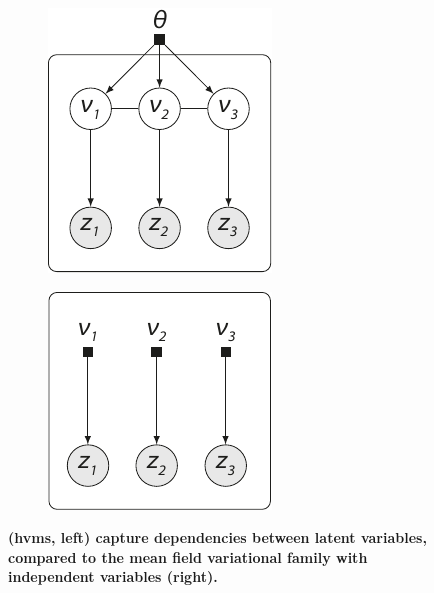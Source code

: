 \newcommand{\mywidtht}{0.25\textheight}
\newcommand{\figwidtht}{0.3\textheight}
\begin{figure}[t]
  \centering
  \hfill%
  \begin{subfigure}[b]{\figwidtht}
    \centering
    \includegraphics[width=\mywidtht]{ch-hvm/fig/hierarchical-variational-model.pdf}
    \label{fig:hvm-graphical-model}%
  \end{subfigure}
  \hspace*{\fill}%
  \begin{subfigure}[b]{\figwidtht}
    \centering
    \includegraphics[width=\mywidtht]{ch-hvm/fig/mean-field-graphical-model.pdf}
    \label{fig:mean field-graphical-model}%
  \end{subfigure}
  \hspace*{\fill}%
  \caption[\textsc{hvm} and mean field approximation graphical models]{\textbf{ (\glspl{hvm}, left) capture dependencies between latent variables, compared to the mean field variational family with independent variables (right).}}
  \label{fig:graphical-model}
\end{figure}